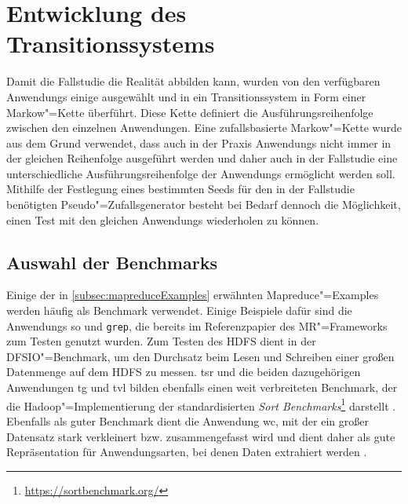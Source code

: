 \section{Entwicklung des Transitionssystems}
\label{sec:transitionsystem}

Damit die Fallstudie die Realität abbilden kann, wurden von den verfügbaren \glspl{Anwendung} einige ausgewählt und in ein Transitionssystem in Form einer Markow"=Kette überführt.
Diese Kette definiert die Ausführungsreihenfolge zwischen den einzelnen Anwendungen.
Eine zufallsbasierte Markow"=Kette wurde aus dem Grund verwendet, dass auch in der Praxis \glspl{Anwendung} nicht immer in der gleichen Reihenfolge ausgeführt werden und daher auch in der Fallstudie eine unterschiedliche Ausführungsreihenfolge der \glspl{Anwendung} ermöglicht werden soll.
Mithilfe der Festlegung eines bestimmten Seeds für den in der Fallstudie benötigten Pseudo"=Zufallsgenerator besteht bei Bedarf dennoch die Möglichkeit, einen \gls{Test} mit den gleichen \glspl{Anwendung} wiederholen zu können.

\subsection{Auswahl der Benchmarks}
\label{subsec:appSelection}

Einige der in \cref{subsec:mapreduceExamples} erwähnten Mapreduce"=Examples werden häufig als Benchmark verwendet.
Einige Beispiele dafür sind die \glspl{Anwendung} \acrlong{so} und \texttt{grep}, die bereits im Referenzpapier \cite{Dean2004} des \gls{MR}"=Frameworks zum Testen genutzt wurden.
Zum Testen des \gls{HDFS} dient in \cite{Shvachko2010} der DFSIO"=Benchmark, um den Durchsatz beim Lesen und Schreiben einer großen Datenmenge auf dem \gls{HDFS} zu messen.
\acrlong{tsr} und die beiden dazugehörigen Anwendungen \acrlong{tg} und \acrlong{tvl} bilden ebenfalls einen weit verbreiteten Benchmark, der die Hadoop"=Implementierung der standardisierten \emph{Sort Benchmarks}\footnote{\url{https://sortbenchmark.org/}} darstellt \cite{Graves2013}.
Ebenfalls als guter Benchmark dient die \gls{Anwendung} \acrlong{wc}, mit der ein großer Datensatz stark verkleinert bzw. zusammengefasst wird und dient daher als gute Repräsentation für Anwendungsarten, bei denen Daten extrahiert werden \cite{Huang2010,Chen2012}.

